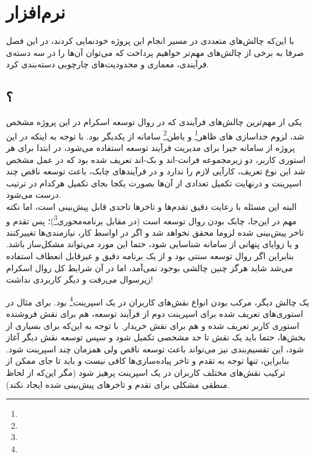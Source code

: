 \chapter{نرم‌افزار}

با این‌که چالش‌های متعددی در مسیر انجام این پروژه خودنمایی کردند، در این فصل صرفا به برخی از چالش‌های مهم‌تر خواهیم پرداخت که می‌توان آن‌ها را در سه دسته‌ی فرآیندی، معماری و محدودیت‌های چارچوبی دسته‌بندی کرد.

\section{؟}


یکی از مهم‌ترین چالش‌های فرآیندی که در روال توسعه اسکرام در این پروژه مشخص شد، لزوم جداسازی های ظاهر\footnote{} و باطن\footnote{} سامانه از یکدیگر بود. با توجه به اینکه در این پروژه از سامانه جیرا برای مدیریت فرآیند توسعه استفاده می‌شود، در ابتدا برای هر استوری کاربر، دو زیرمجموعه فرانت-اند و بک-اند تعریف شده بود که در عمل مشخص شد این نوع تعریف، کارآیی لازم را ندارد و در فرآیندهای چابک، باعث توسعه ناقص چند اسپرینت و درنهایت تکمیل تعدادی از آن‌ها بصورت یکجا بجای تکمیل هرکدام در ترتیب درست می‌شود.\\

البته این مسئله با رعایت دقیق تقدم‌ها و تاخرها تاحدی قابل پیش‌بینی است، اما نکته مهم در این‌جا، چابک بودن روال توسعه است (در مقابل برنامه‌محوری\footnote{})؛ پس تقدم و تاخر پیش‌بینی شده لزوما محقق نخواهد شد و اگر در اواسط کار، نیازمندی‌ها تغییرکنند و یا زوایای پنهانی از سامانه شناسایی شود، حتما این مورد می‌تواند مشکل‌ساز باشد. بنابراین اگر روال توسعه سنتی بود و از یک برنامه دقیق و غیرقابل انعطاف استفاده می‌شد شاید هرگز چنین چالشی بوجود نمی‌آمد، اما در آن شرایط کل روال اسکرام زیرسوال می‌رفت و دیگر کاربردی نداشت!\\

\newpage


یک چالش دیگر، مرکب بودن انواع نقش‌های کاربران در یک اسپرینت\footnote{} بود. برای مثال در استوری‌های تعریف شده برای اسپرینت دوم از فرآیند توسعه، هم برای نقش فروشنده استوری کاربر تعریف شده و هم برای نقش خریدار. با توجه به این‌که برای بسیاری از بخش‌ها، حتما باید یک نقش تا حد مشخصی تکمیل شود و سپس توسعه نقش دیگر آغاز شود، این تقسیم‌بندی نیز می‌تواند باعث توسعه ناقص ولی همزمان چند اسپرینت شود. بنابراین، تنها توجه به تقدم و تاخر پیاده‌سازی‌ها کافی نیست و باید تا جای ممکن از ترکیب نقش‌های مختلف کاربران در یک اسپرینت پرهیز شود (مگر این‌که از لحاظ منطقی مشکلی برای تقدم و تاخرهای پیش‌بینی شده ایجاد نکند).\\

